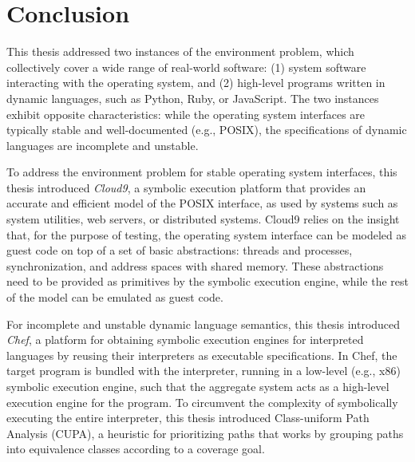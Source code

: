 \documentclass[letterpaper,10pt,oneside]{book}
\newcommand{\cnine}{Cloud9\xspace}
\newcommand{\chef}{Chef\xspace}
\begin{document}
\chapter{Conclusion}
\label{ch:conclusion}

This thesis addressed two instances of the environment problem, which collectively cover a wide range of real-world software: (1) system software interacting with the operating system, and (2) high-level programs written in dynamic languages, such as Python, Ruby, or JavaScript.  The two instances exhibit opposite characteristics: while the operating system interfaces are typically stable and well-documented (e.g., POSIX), the specifications of dynamic languages are incomplete and unstable.

To address the environment problem for stable operating system interfaces, this thesis introduced \emph{\cnine}, a symbolic execution platform that provides an accurate and efficient model of the POSIX interface, as used by systems such as system utilities, web servers, or distributed systems.
%
\cnine relies on the insight that, for the purpose of testing, the operating system interface can be modeled as guest code on top of a set of basic abstractions: threads and processes, synchronization, and address spaces with shared memory. These abstractions need to be provided as primitives by the symbolic execution engine, while the rest of the model can be emulated as guest code.

For incomplete and unstable dynamic language semantics, this thesis introduced \emph{\chef}, a platform for obtaining symbolic execution engines for interpreted languages by reusing their interpreters as executable specifications.  In \chef, the target program is bundled with the interpreter, running in a low-level (e.g., x86) symbolic execution engine, such that the aggregate system acts as a high-level execution engine for the program.
%
%
To circumvent the complexity of symbolically executing the entire interpreter, this thesis introduced Class-uniform Path Analysis (CUPA), a heuristic for prioritizing paths that works by grouping paths into equivalence classes according to a coverage goal.



\end{document}
